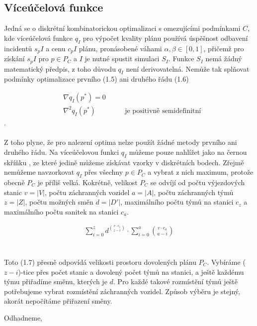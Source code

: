 \subsection{Víceúčelová funkce}

Jedná se o diskrétní kombinatorickou optimalizaci s omezujícími podmínkami $C$, kde víceúčelová funkce $q_I$ pro výpočet kvality plánu používá úspěšnost
odbavení incidentů $s_pI$ a cenu $c_pI$ plánu, pronásobené váhami $\alpha, \beta \in [0, 1]$,
přičemž pro získání $s_pI$ pro $p \in P_C$ a $I$ je nutné spustit simulaci $S_I$.
Funkce $S_I$ nemá žádný matematický předpis, z toho důvodu $q_I$ není derivovatelná.
Nemůže tak splňovat podmínky optimalizace prvního (1.5) ani druhého řádu (1.6) %

\begin{align}
  &\nabla q_I(p^*) = 0 \\
  &\nabla^2 q_I(p^*) \hspace{50pt} \text{je positivně semidefinitní}
\end{align}
.
\\
\\
Z toho plyne, že pro nalezení optima nelze použít žádné metody prvního ani druhého řádu. %
Na víceúčelovou funkci $q_I$ můžeme pouze nahlížet jako na černou skříňku %
, ze které jedině můžeme získávat vzorky v diskrétních bodech.
Zřejmě nemůžeme navzorkovat $q_I$ přes všechny $p \in P_C$ a vybrat z nich maximum, protože obecně $P_C$ je příliš velká.
Kokrétně, velikost $P_C$ se odvíjí od počtu výjezdových stanic $v = |V|$, počtu záchranných vozidel $a = |A|$, počtu záchranných týmů $z = |Z|$, počtu možných směn $d = |D'|$, 
maximálního počtu týmů na stanici $c_z$ a maximálního počtu sanitek na stanici $c_a$.

\begin{align}
  \sum_{i=0}^{z}{d^{v \cdot c_z \choose z - i}} \cdot \sum_{i = 0}^{a}{v \cdot c_a \choose a - i}
\end{align}
\\
\\
Toto (1.7) %
přesně odpovídá velikosti prostoru dovolených plánu $P_C$. Vybíráme ($z-i$)-tice přes počet stanic a dovolený počet týmů na stanici, a ještě každému týmu
přiřadíme směnu, kterých je $d$. Pro každé takové rozmístění týmů ještě potřebujeme vybrat rozmístění záchranných vozidel.
Způsob výběru je stejný, akorát nepočítáme přiřazení směny.

\clearpage

Odhadneme,

